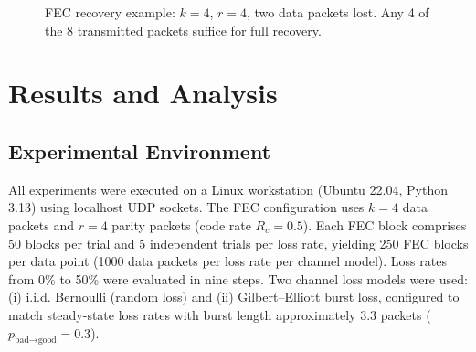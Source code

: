 \documentclass[conference]{IEEEtran}
\begin{document}
\begin{figure}[!t]
\caption{FEC recovery example: $k=4$, $r=4$, two data packets lost.
  Any 4 of the 8 transmitted packets suffice for full recovery.}
\label{fig:recovery}
\end{figure}

\section{Results and Analysis}
\label{sec:results}

\subsection{Experimental Environment}

All experiments were executed on a Linux workstation (Ubuntu 22.04,
Python 3.13) using localhost UDP sockets. The FEC configuration uses
$k = 4$ data packets and $r = 4$ parity packets (code rate $R_c = 0.5$).
Each FEC block comprises 50 blocks per trial and 5 independent trials
per loss rate, yielding 250 FEC blocks per data point (1000 data packets
per loss rate per channel model). Loss rates from 0\% to 50\% were
evaluated in nine steps. Two channel loss models were used: (i) i.i.d.
Bernoulli (random loss) and (ii) Gilbert--Elliott burst loss, configured
to match steady-state loss rates with burst length approximately 3.3
packets ($p_{\text{bad}\to\text{good}} = 0.3$).
\end{document}
